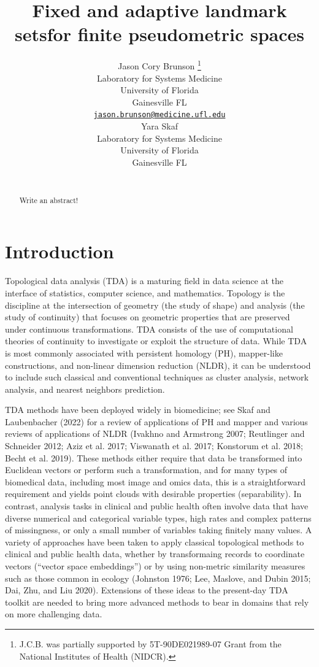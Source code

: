 \documentclass{article}
\title{Fixed and adaptive landmark sets\linebreak for finite
pseudometric spaces}
\author{
    Jason Cory Brunson
    \thanks{J.C.B. was partially supported by 5T-90DE021989-07 Grant
from the National Institutes of Health (NIDCR).}
   \\
    Laboratory for Systems Medicine \\
    University of Florida \\
  Gainesville FL \\
  \texttt{\href{mailto:jason.brunson@medicine.ufl.edu}{\nolinkurl{jason.brunson@medicine.ufl.edu}}} \\
   \And
    Yara Skaf
   \\
    Laboratory for Systems Medicine \\
    University of Florida \\
  Gainesville FL \\
  \texttt{} \\
  }
\begin{document}
\maketitle


\begin{abstract}
Write an abstract!
\end{abstract}


\hypertarget{introduction}{%
\section{Introduction}\label{introduction}}

Topological data analysis (TDA) is a maturing field in data science at
the interface of statistics, computer science, and mathematics. Topology
is the discipline at the intersection of geometry (the study of shape)
and analysis (the study of continuity) that focuses on geometric
properties that are preserved under continuous transformations. TDA
consists of the use of computational theories of continuity to
investigate or exploit the structure of data. While TDA is most commonly
associated with persistent homology (PH), mapper-like constructions, and
non-linear dimension reduction (NLDR), it can be understood to include
such classical and conventional techniques as cluster analysis, network
analysis, and nearest neighbors prediction.

TDA methods have been deployed widely in biomedicine; see Skaf and
Laubenbacher (2022) for a review of applications of PH and mapper and
various reviews of applications of NLDR (Ivakhno and Armstrong 2007;
Reutlinger and Schneider 2012; Aziz et al. 2017; Viswanath et al. 2017;
Konstorum et al. 2018; Becht et al. 2019). These methods either require
that data be transformed into Euclidean vectors or perform such a
transformation, and for many types of biomedical data, including most
image and omics data, this is a straightforward requirement and yields
point clouds with desirable properties (separability). In contrast,
analysis tasks in clinical and public health often involve data that
have diverse numerical and categorical variable types, high rates and
complex patterns of missingness, or only a small number of variables
taking finitely many values. A variety of approaches have been taken to
apply classical topological methods to clinical and public health data,
whether by transformaing records to coordinate vectors (``vector space
embeddings'') or by using non-metric similarity measures such as those
common in ecology (Johnston 1976; Lee, Maslove, and Dubin 2015; Dai,
Zhu, and Liu 2020). Extensions of these ideas to the present-day TDA
toolkit are needed to bring more advanced methods to bear in domains
that rely on more challenging data.
\end{document}
